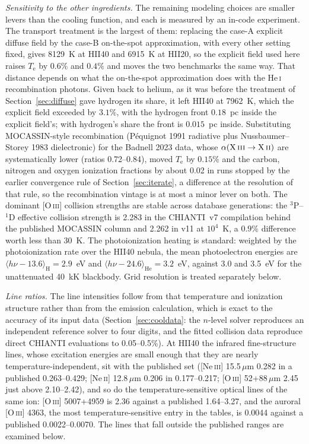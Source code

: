 \documentclass[twocolumn,linenumbers]{aastex702}
\newcommand{\HeI}{He\,\textsc{i}}
\newcommand{\Te}{T_{\mathrm{e}}}
\begin{document}
\emph{Sensitivity to the other ingredients.}  The remaining modeling
choices are smaller levers than the cooling function, and each is measured
by an in-code experiment.  The transport treatment is the largest of them:
replacing the case-A explicit diffuse field by the case-B on-the-spot
approximation, with every other setting fixed, gives 8129~K at HII40 and
6915~K at HII20, so the explicit field used here raises $\Te$ by
$0.6\%$ and $0.4\%$ and moves the two benchmarks the same way.  That
distance depends on what the on-the-spot approximation does with the
\HeI{} recombination photons.  Given back to helium, as it was before the
treatment of Section~\ref{sec:diffuse} gave hydrogen its share, it left
HII40 at 7962~K, which the explicit field exceeded by $3.1\%$, with the
hydrogen front $0.18$~pc inside the explicit field's; with hydrogen's share the front is $0.015$~pc inside.  Substituting
MOCASSIN-style recombination
(P\'equignot 1991 radiative plus Nussbaumer--Storey 1983 dielectronic) for
the Badnell 2023 data, whose $\alpha(\mathrm{X\,\textsc{iii}} \to
\mathrm{X\,\textsc{ii}})$ are systematically lower (ratios 0.72--0.84),
moved $\Te$ by $0.15\%$ and the carbon, nitrogen and oxygen ionization
fractions by about 0.02 in runs stopped by the earlier convergence rule of
Section~\ref{sec:iterate}, a difference at the resolution of that rule, so
the recombination vintage is at most a minor lever on both.  The dominant
[O\,\textsc{iii}] collision strengths are stable across database
generations: the $^3\mathrm{P}$--$^1\mathrm{D}$ effective collision
strength is 2.283 in the CHIANTI~v7 compilation behind the published
MOCASSIN column and 2.262 in v11 at $10^4$~K, a $0.9\%$ difference worth
less than 30~K.  The photoionization heating is standard: weighted by the
photoionization rate over the HII40 nebula, the mean photoelectron energies
are $\langle h\nu - 13.6\rangle_{\mathrm{H}} = 2.9$~eV and
$\langle h\nu - 24.6\rangle_{\mathrm{He}} = 3.2$~eV, against 3.0 and
3.5~eV for the unattenuated 40~kK blackbody.  Grid resolution
is treated separately below.

\emph{Line ratios.}  The line intensities follow from that temperature and
ionization structure rather than from the emission calculation, which is
exact to the accuracy of its input data (Section~\ref{sec:cooldata}: the
$n$-level solver reproduces an independent reference solver to four digits,
and the fitted collision data reproduce direct CHIANTI evaluations to
0.05--0.5\%).  At HII40 the infrared fine-structure lines, whose excitation
energies are small enough that they are nearly temperature-independent, sit
with the published set ([Ne\,\textsc{iii}] 15.5\,$\mu$m 0.282 in a
published 0.263--0.429; [Ne\,\textsc{ii}] 12.8\,$\mu$m 0.206 in
0.177--0.217; [O\,\textsc{iii}] 52+88\,$\mu$m 2.45 just above 2.10--2.42),
and so do the temperature-sensitive optical lines of the same ion:
[O\,\textsc{iii}] 5007+4959 is 2.36 against a published 1.64--3.27, and the
auroral [O\,\textsc{iii}] 4363, the most temperature-sensitive entry in the
tables, is 0.0044 against a published 0.0022--0.0070.  The lines that fall
outside the published ranges are examined below.
\end{document}
